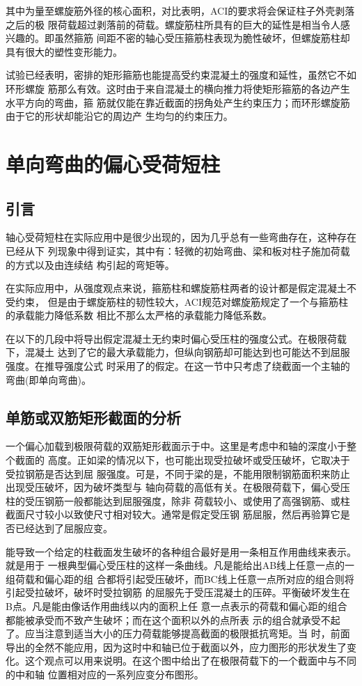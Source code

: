 \documentclass[12pt,a4paper]{book}
\begin{document}
其中为量至螺旋筋外径的核心面积，对比表明，ACI的要求将会保证柱子外壳剥落之后的极
限荷载超过剥落前的荷载。螺旋筋柱所具有的巨大的延性是相当令人感兴趣的。即虽然箍筋
间距不密的轴心受压箍筋柱表现为脆性破坏，但螺旋筋柱却具有很大的塑性变形能力。

试验已经表明，密排的矩形箍筋也能提高受约束混凝土的强度和延性，虽然它不如环形螺旋
筋那么有效。这时由于来自混凝土的横向推力将使矩形箍筋的各边产生水平方向的弯曲，箍
筋就仅能在靠近截面的拐角处产生约束压力；而环形螺旋筋由于它的形状却能沿它的周边产
生均匀的约束压力。

\section{单向弯曲的偏心受荷短柱}

\subsection{引言}

轴心受荷短柱在实际应用中是很少出现的，因为几乎总有一些弯曲存在，这种存在已经从下
列现象中得到证实，其中有：轻微的初始弯曲、梁和板对柱子施加荷载的方式以及由连续结
构引起的弯矩等。

在实际应用中，从强度观点来说，箍筋柱和螺旋筋柱两者的设计都是假定混凝土不受约束，
但是由于螺旋筋柱的韧性较大，ACI规范对螺旋筋规定了一个与箍筋柱的承载能力降低系数
相比不那么太严格的承载能力降低系数。

在以下的几段中将导出假定混凝土无约束时偏心受压柱的强度公式。在极限荷载下，混凝土
达到了它的最大承载能力，但纵向钢筋却可能达到也可能达不到屈服强度。在推导强度公式
时采用了的假定。在这一节中只考虑了绕截面一个主轴的弯曲(即单向弯曲)。

\subsection{单筋或双筋矩形截面的分析}

一个偏心加载到极限荷载的双筋矩形截面示于中。这里是考虑中和轴的深度小于整个截面的
高度。正如梁的情况以下，也可能出现受拉破坏或受压破坏，它取决于受拉钢筋是否达到屈
服强度。可是，不同于梁的是，不能用限制钢筋面积来防止出现受压破坏，因为破坏类型与
轴向荷载的高低有关。在极限荷载下，偏心受压柱的受压钢筋一般都能达到屈服强度，除非
荷载较小、或使用了高强钢筋、或柱截面尺寸较小以致使尺寸相对较大。通常是假定受压钢
筋屈服，然后再验算它是否已经达到了屈服应变。

能导致一个给定的柱截面发生破坏的各种组合最好是用一条相互作用曲线来表示。就是用于
一根典型偏心受压柱的这样一条曲线。凡是能给出AB线上任意一点的一组荷载和偏心距的组
合都将引起受压破坏，而BC线上任意一点所对应的组合则将引起受拉破坏，破坏时受拉钢筋
的屈服先于受压混凝土的压碎。平衡破坏发生在B点。凡是能由像话作用曲线以内的面积上任
意一点表示的荷载和偏心距的组合都能被承受而不致产生破坏；而在这个面积以外的点所表
示的组合就承受不起了。应当注意到适当大小的压力荷载能够提高截面的极限抵抗弯矩。当
时，前面导出的全然不能应用，因为这时中和轴已位于截面以外，应力图形的形状发生了变
化。这个观点可以用来说明。在这个图中给出了在极限荷载下的一个截面中与不同的中和轴
位置相对应的一系列应变分布图形。
\end{document}
